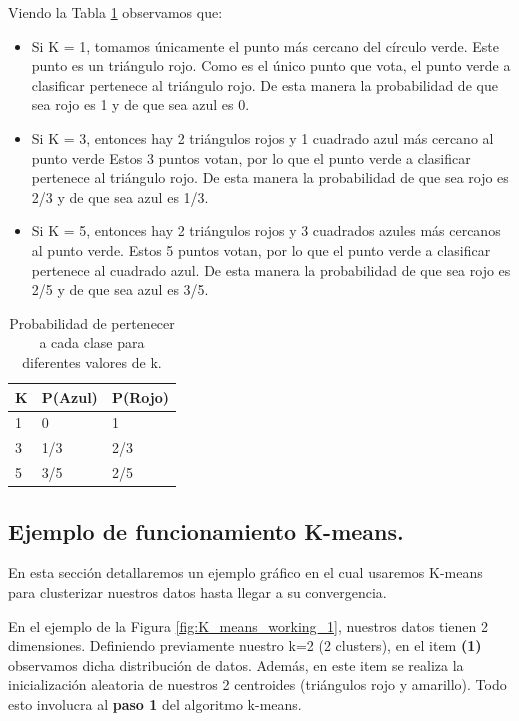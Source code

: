 \documentclass[12pt,a4paper]{article}
\begin{document}
\begin{sloppypar}
Viendo la Tabla \ref{table:2} observamos que:

\begin{itemize}
\item Si K = 1, tomamos únicamente el punto más cercano del círculo verde. Este punto es un triángulo rojo. Como es el único punto que vota, el punto verde a clasificar pertenece al triángulo rojo. De esta manera la probabilidad de que sea rojo es 1 y de que sea azul es 0.
\item Si K = 3, entonces hay 2 triángulos rojos y 1 cuadrado azul más cercano al punto verde Estos 3 puntos votan, por lo que el punto verde a clasificar pertenece al triángulo rojo. De esta manera la probabilidad de que sea rojo es 2/3  y de que sea azul es 1/3.
\item Si K = 5, entonces hay 2 triángulos rojos y 3 cuadrados azules más cercanos al punto verde. Estos 5 puntos votan, por lo que el punto verde a clasificar pertenece al cuadrado azul. De esta manera la probabilidad de que sea rojo es 2/5 y de que sea azul es 3/5.
\end{itemize}

\begin{table}[h!]
\centering
\begin{tabular}{|p{2cm}|p{2cm}|p{2cm}|}
\hline
\textbf{K} & \textbf{P(Azul)} & \textbf{P(Rojo)} \\ [1ex] 
\hline
1 & 0 & 1 \\
\hline
3 & 1/3 & 2/3 \\
\hline
5 & 3/5 & 2/5 \\
\hline
\end{tabular}
\caption{Probabilidad de pertenecer a cada clase para diferentes valores de k.}
\label{table:2}
\end{table}

\cleardoublepage

\subsection{Ejemplo de funcionamiento K-means.}\label{anexo_k_means}

En esta sección detallaremos un ejemplo gráfico en el cual usaremos K-means para clusterizar nuestros datos hasta llegar a su convergencia. 

En el ejemplo de la Figura \ref{fig:K_means_working_1}, nuestros datos tienen 2 dimensiones. Definiendo previamente nuestro k=2 (2 clusters), en el item \textbf{(1)} observamos dicha distribución de datos. Además, en este item se realiza la inicialización aleatoria de nuestros 2 centroides (triángulos rojo y amarillo). Todo esto involucra al \textbf{paso 1} del algoritmo k-means.  


\end{sloppypar}
\end{document}
